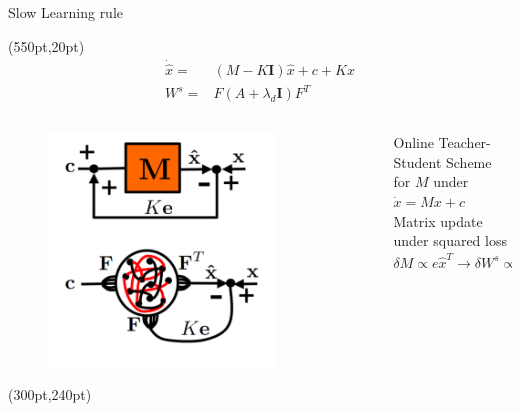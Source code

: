 \documentclass[17pt, t, lualatex]{beamer}
\begin{document}
\begin{frame}{Slow Learning rule}


	\begin{textblock*}{10pt}(550pt,20pt)
		\small
		\begin{equation*}
		\begin{aligned}
			\dot{\hat{x}}=&(M-K \mathbf{I}) \hat{x}+c+K x\\
			W^s =& F\left(A + \lambda_d\mathbf{I}\right)F^T
		\end{aligned}
		\end{equation*}
	\end{textblock*}

	\begin{columns}
		\begin{column}{0.45\textwidth}
			\begin{figure}
				\centering
				\includegraphics[width = 0.8\textwidth,trim= 0cm 0cm 0cm 8cm]{figures/slow_learning_rule.png}
			\end{figure}
			\begin{textblock*}{10pt}(300pt,240pt)
				\small
				\cite{bourdoukan_enforcing_2015}
			\end{textblock*}
		\end{column}
		\begin{column}{0.45\textwidth}
			Online Teacher-Student Scheme for $M$ under $\dot{x} = Mx +c$\\
			Matrix update under squared loss
			\begin{equation}
				\delta M \propto e\hat{x}^T \longrightarrow\delta W^s \propto F^T \left(e\hat{x}^T\right)F \approx F^T er
			\end{equation}
		\end{column}
	\end{columns}
\end{frame}
\end{document}
